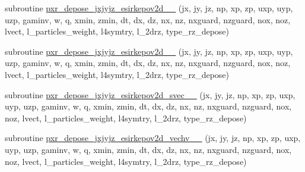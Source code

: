 \begin{DoxyCompactItemize}
\item 
subroutine \hyperlink{current__deposition__2d_8_f90_a439e9054acf0ed39dd909d54226b1ba0}{pxr\+\_\+depose\+\_\+jxjyjz\+\_\+esirkepov2d\+\_\+\_} (jx, jy, jz, np, xp, zp, uxp, uyp, uzp, gaminv, w, q, xmin, zmin,                                                                                                                                                                                               dt, dx, dz, nx, nz, nxguard, nzguard,                                                                                                                                                                                               nox, noz, lvect, l\+\_\+particles\+\_\+weight, l4symtry, l\+\_\+2drz, type\+\_\+rz\+\_\+depose)
\item 
subroutine \hyperlink{current__deposition__2d_8_f90_a6843700efcf408ff15287bbb6c67747e}{pxr\+\_\+depose\+\_\+jxjyjz\+\_\+esirkepov2d\+\_\+\_} (jx, jy, jz, np, xp, zp, uxp, uyp, uzp, gaminv, w, q, xmin, zmin,                                                                                                                                                                                               dt, dx, dz, nx, nz, nxguard, nzguard,                                                                                                                                                                                               nox, noz, lvect, l\+\_\+particles\+\_\+weight, l4symtry, l\+\_\+2drz, type\+\_\+rz\+\_\+depose)
\item 
subroutine \hyperlink{current__deposition__2d_8_f90_a215d16020f994b7043b8c1b0400faa48}{pxr\+\_\+depose\+\_\+jxjyjz\+\_\+esirkepov2d\+\_\+svec\+\_\+\_} (jx, jy, jz, np, xp, zp, uxp, uyp, uzp, gaminv, w, q, xmin, zmin,                                                                                                                                                                                               dt, dx, dz, nx, nz, nxguard, nzguard,                                                                                                                                                                                               nox, noz, lvect, l\+\_\+particles\+\_\+weight, l4symtry, l\+\_\+2drz, type\+\_\+rz\+\_\+depose)
\item 
subroutine \hyperlink{current__deposition__2d_8_f90_a0cbc0a93a581ce24a8bc06195892fe59}{pxr\+\_\+depose\+\_\+jxjyjz\+\_\+esirkepov2d\+\_\+vechv\+\_\+\_} (jx, jy, jz, np, xp, zp, uxp, uyp, uzp,                               gaminv, w, q, xmin, zmin,                                   dt, dx, dz, nx, nz, nxguard, nzguard,                               nox, noz, lvect, l\+\_\+particles\+\_\+weight, l4symtry, l\+\_\+2drz, type\+\_\+rz\+\_\+depose)
\end{DoxyCompactItemize}


